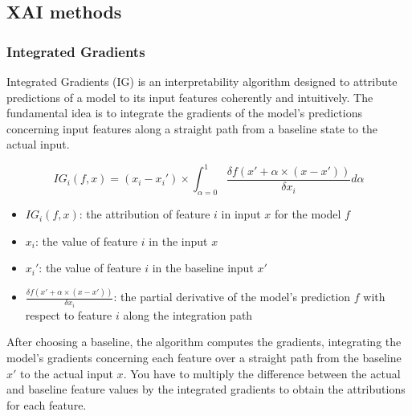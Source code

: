 \documentclass[11pt]{article}
\begin{document}
\begin{multicols*}{2}

\subsection{XAI methods}
\subsubsection{Integrated Gradients}
Integrated Gradients (IG) \cite{sundararajan2017axiomatic} is an interpretability algorithm designed to attribute predictions of a model to its input features coherently and intuitively. The fundamental idea is to integrate the gradients of the model's predictions concerning input features along a straight path from a baseline state to the actual input.

\small{$$IG_i(f,x) = (x_i - x_i') \times \int_{\alpha = 0}^1 \frac{\delta f(x' + \alpha \times (x - x'))}{\delta x_i} d\alpha$$}

\begin{itemize}
    \item $IG_i(f,x)$: the attribution of feature $i$ in input $x$ for the model $f$
    \item $x_i$: the value of feature $i$ in the input $x$
    \item $x_i'$: the value of feature $i$ in the baseline input $x'$
    \item $\frac{\delta f(x' + \alpha \times (x - x'))}{\delta x_i}$: the partial derivative of the model's prediction $f$ with respect to feature $i$ along the integration path
\end{itemize}

After choosing a baseline, the algorithm computes the gradients, integrating the model's gradients concerning each feature over a straight path from the baseline $x'$ to the actual input $x$. You have to multiply the difference between the actual and baseline feature values by the integrated gradients to obtain the attributions for each feature.


\end{multicols*}
\end{document}
